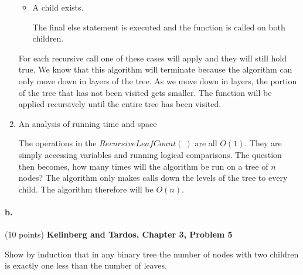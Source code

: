 \documentclass[letterpaper,11pt]{article}
\begin{document}
\begin{enumerate}
\begin{itemize}
              \item A child exists.

                  The final else statement is executed and the function is called
                  on both children.

          \end{itemize}

          For each recursive call one of these cases will apply and they will 
          still hold true. We know that this algorithm will terminate because 
          the algorithm can only move down in layers of the tree. As we move 
          down in layers, the portion of the tree that has not been visited
          gets smaller. The function will be applied recursively until the 
          entire tree has been visited.

      \item An analysis of running time and space

          The operations in the $RecursiveLeafCount\left( \  \right) $ are all 
          $O\left( 1 \right) $. They are simply accessing variables and running
          logical comparisons. The question then becomes, how many times will 
          the algorithm be run on a tree of $n$ nodes? The algorithm only makes
          calls down the levels of the tree to every child. The algorithm 
          therefore will be $O\left( n \right) $.
  \end{enumerate}

\paragraph{b.} (10 points) {\bf Kelinberg and Tardos, Chapter 3, Problem 5}

Show by induction that in any binary tree the number of nodes with two children is exactly one less than the number of leaves.

    \color{teal}
        
\end{document}

